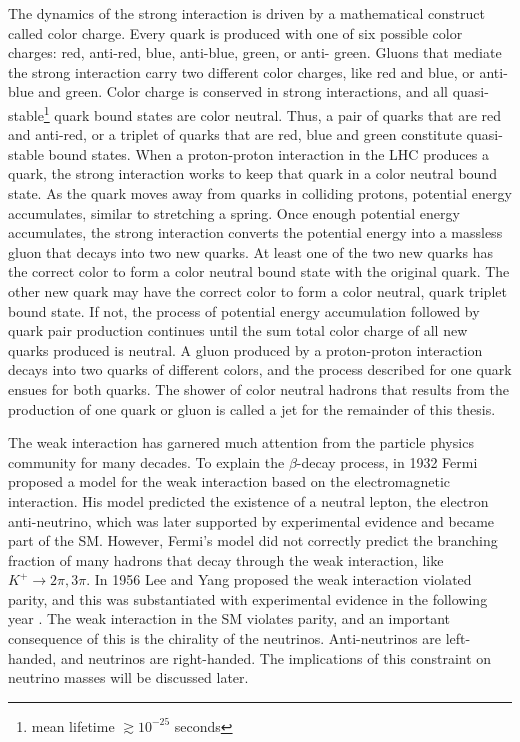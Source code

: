 The dynamics of the strong interaction is driven by a mathematical construct called color charge.  Every 
quark is produced with one of six possible color charges: red, anti-red, blue, anti-blue, green, or anti-
green.  Gluons that mediate the strong interaction carry two different color charges, like red and blue, 
or anti-blue and green.  Color charge is conserved in strong interactions, and all quasi-
stable\footnote{mean lifetime $\gtrsim 10^{-25}$ seconds} quark bound states 
are color neutral.  Thus, a pair of quarks that are red and anti-red, or a triplet of quarks that are 
red, blue and green constitute quasi-stable bound states.  When a proton-proton interaction in the LHC 
produces a quark, the strong interaction works to keep that quark in a color neutral bound state.  As the 
quark moves away from quarks in colliding protons, potential energy accumulates, similar to stretching a 
spring.  Once enough potential energy accumulates, the strong interaction converts the potential energy 
into a massless gluon that decays into two new quarks.  At least one of the two new quarks has 
the correct color to form a color neutral bound state with the original quark.  The other new quark may 
have the correct color to form a color neutral, quark triplet bound state.  If not, the process of 
potential energy accumulation followed by quark pair production continues until the sum total color 
charge of all new quarks produced is neutral.  A gluon produced by a proton-proton interaction 
decays into two quarks of different colors, and the process described for one quark ensues for both 
quarks.  The shower of color neutral hadrons that results from the production of one quark or gluon 
is called a jet for the remainder of this thesis.

The weak interaction has garnered much attention from the particle physics community for many decades.  
To explain the $\beta$-decay process, in 1932 Fermi proposed a model for the weak interaction based on 
the electromagnetic interaction.  His model predicted the existence of a neutral lepton, the electron 
anti-neutrino, which was later supported by experimental evidence \cite{firstNuDiscovery} and became part of the SM.  However, Fermi's 
model did not correctly predict the branching fraction of many hadrons that decay through the weak 
interaction, like $K^{+} \rightarrow 2\pi, 3\pi$.  In 1956 Lee and Yang proposed the weak interaction 
violated parity, and this was substantiated with experimental evidence in the following year \cite{weakParityViolation}.  
The weak interaction in the SM violates parity, and an important consequence of this is the chirality of 
the neutrinos.  Anti-neutrinos are left-handed, and neutrinos are right-handed.  The implications of this 
constraint on neutrino masses will be discussed later.


